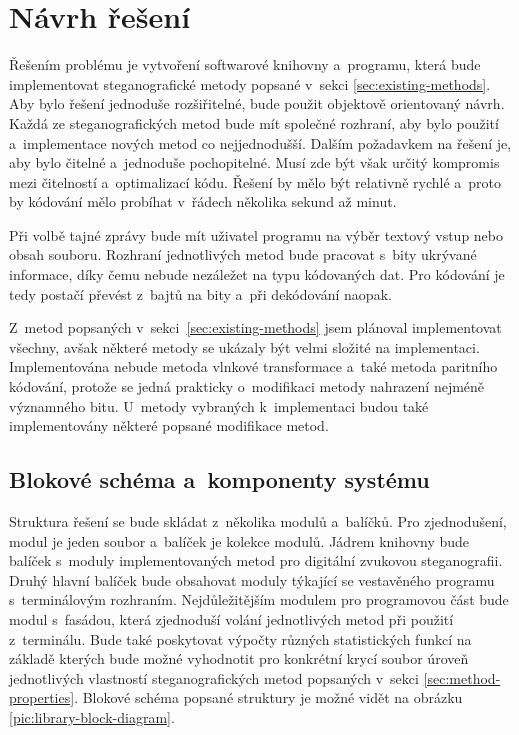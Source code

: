 \section{Návrh řešení}
\label{sec:solution-proposal}

Řešením problému je vytvoření softwarové knihovny a~programu, která bude
implementovat steganografické metody popsané v~sekci
\ref{sec:existing-methods}. Aby bylo řešení jednoduše rozšiřitelné, bude použit
objektově orientovaný návrh. Každá ze steganografických metod bude mít společné
rozhraní, aby bylo použití a~implementace nových metod co nejjednodušší. Dalším
požadavkem na řešení je, aby bylo čitelné a~jednoduše pochopitelné. Musí zde
být však určitý kompromis mezi čitelností a~optimalizací kódu. Řešení by mělo
být relativně rychlé a~proto by kódování mělo probíhat v~řádech několika sekund
až minut.

Při volbě tajné zprávy bude mít uživatel programu na výběr textový vstup nebo
obsah souboru. Rozhraní jednotlivých metod bude pracovat s~bity ukrývané
informace, díky čemu nebude nezáležet na typu kódovaných dat. Pro kódování je
tedy postačí převést z~bajtů na bity a~při dekódování naopak.

Z~metod popsaných v~sekci~\ref{sec:existing-methods} jsem plánoval
implementovat všechny, avšak některé metody se ukázaly být velmi složité na
implementaci. Implementována nebude metoda vlnkové transformace a~také metoda
paritního kódování, protože se jedná prakticky o~modifikaci metody nahrazení
nejméně významného bitu. U~metody vybraných k~implementaci budou také
implementovány některé popsané modifikace metod.

\subsection*{Blokové schéma a~komponenty systému}
\label{sub:solution-components}

Struktura řešení se bude skládat z~několika modulů a~balíčků. Pro zjednodušení,
modul je jeden soubor a~balíček je kolekce modulů. Jádrem knihovny bude balíček
s~moduly implementovaných metod pro digitální zvukovou steganografii. Druhý
hlavní balíček bude obsahovat moduly týkající se vestavěného programu
s~terminálovým rozhraním. Nejdůležitějším modulem pro programovou část bude
modul s~fasádou, která zjednoduší volání jednotlivých metod při použití
z~terminálu. Bude také poskytovat výpočty různých statistických funkcí na
základě kterých bude možné vyhodnotit pro konkrétní krycí soubor úroveň
jednotlivých vlastností steganografických metod popsaných v~sekci
\ref{sec:method-properties}. Blokové schéma popsané struktury je možné vidět na
obrázku \ref{pic:library-block-diagram}.

